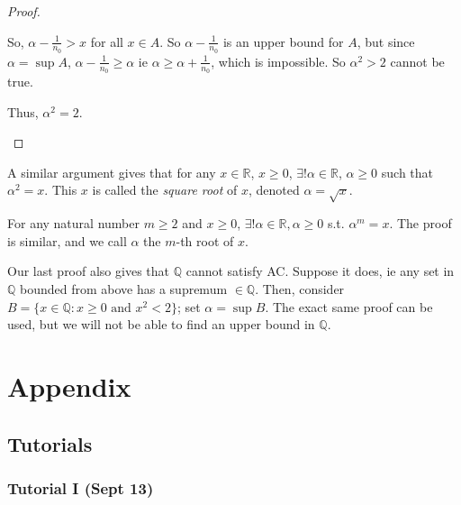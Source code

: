 \documentclass[12pt]{article}
\begin{document}
\begin{proof}[Proof]
\begin{itemize}
\begin{itemize}[label=$\bullet$]
      So, $\alpha - \frac{1}{n_0} > x$ for all $x \in A$. So $\alpha - \frac{1}{n_0}$ is an upper bound for $A$, but since $\alpha = \sup A$, $\alpha - \frac{1}{n_0} \geq \alpha$ ie $\alpha \geq \alpha + \frac{1}{n_0}$, which is impossible. So $\alpha^2 > 2$ cannot be true.
    \end{itemize}

    Thus, $\alpha^2 = 2$.
  \end{itemize}
\end{proof}

\begin{remark}
  A similar argument gives that for any $x \in \mathbb{R}$, $x \geq 0$, $\exists! \alpha \in \mathbb{R}$, $\alpha \geq 0$ such that $\alpha^2 = x$. This $x$ is called the \emph{square root} of $x$, denoted $\alpha = \sqrt{x}$.
\end{remark}

\begin{remark}
  For any natural number $m \geq 2$ and $x \geq 0$, $\exists ! \alpha \in \mathbb{R}, \alpha \geq 0$ s.t. $\alpha^m = x$. The proof is similar, and we call $\alpha$ the $m$-th root of $x$.
\end{remark}

\begin{remark}
  Our last proof also gives that $\mathbb{Q}$ cannot satisfy AC. Suppose it does, ie any set in $\mathbb{Q}$ bounded from above has a supremum $\in \mathbb{Q}$. Then, consider $B = \{x \in \mathbb{Q} : x \geq 0 \text{ and } x^2 < 2\}$; set $\alpha = \sup B$. The exact same proof can be used, but we will not be able to find an upper bound in $\mathbb{Q}$.
\end{remark}


\newpage
\section{Appendix}
\subsection{Tutorials}
\subsubsection{Tutorial I (Sept 13)}
\end{document}
